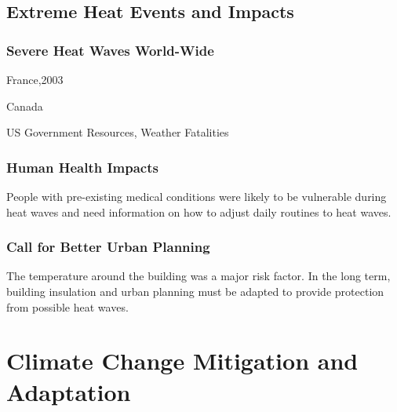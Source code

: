 \documentclass[12pt]{caltech_thesis}
\begin{document}
\section{Extreme Heat Events and Impacts}
\begin{bibunit}
\subsection{Severe Heat Waves World-Wide}
France,2003 \citep{Vandentorren2006}

Canada \citep{Smoyer-Tomic2003}

US Government Resources, Weather Fatalities \citep{CenterforDiseaseControlandPrevention2008}


\subsection{Human Health Impacts}
People with pre-existing medical conditions were likely to be vulnerable during heat waves and need information on how to adjust daily routines to heat waves.\citep{Vandentorren2006}

\subsection{Call for Better Urban Planning}
The temperature around the building was a major risk factor. In the long term, building insulation and urban planning must be adapted to provide protection from possible heat waves. \citep{Vandentorren2006}

\renewcommand{\bibsection}{\section*{\refname}}
\putbib[ownpubs]  %
\end{bibunit}







\chapter{Climate Change Mitigation and Adaptation}
\end{document}

